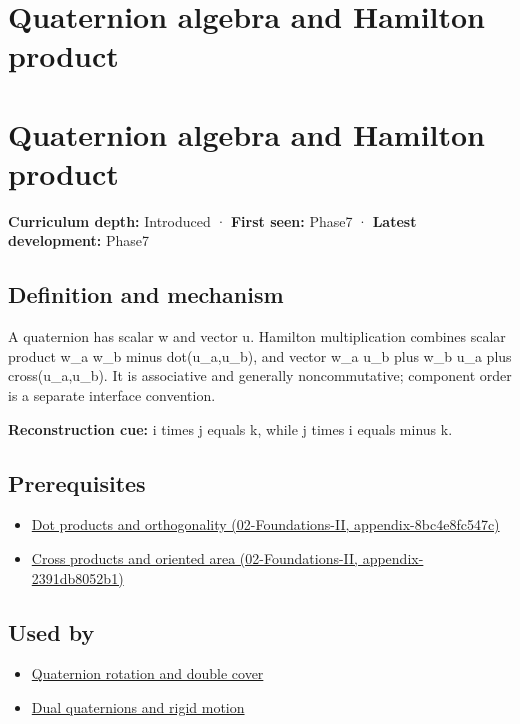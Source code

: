 \hypertarget{appendix-965d9260eeab}{}
\section*{Quaternion algebra and Hamilton product}
\section{Quaternion algebra and Hamilton product}\label{appendix-965d9260eeab-quaternion-algebra-and-hamilton-product}

\textbf{Curriculum depth:} Introduced · \textbf{First seen:} Phase7 · \textbf{Latest development:} Phase7

\subsection{Definition and mechanism}\label{appendix-965d9260eeab-definition-and-mechanism}

A quaternion has scalar w and vector u. Hamilton multiplication combines scalar product w\_a w\_b minus dot(u\_a,u\_b), and vector w\_a u\_b plus w\_b u\_a plus cross(u\_a,u\_b). It is associative and generally noncommutative; component order is a separate interface convention.

\textbf{Reconstruction cue:} i times j equals k, while j times i equals minus k.

\subsection{Prerequisites}\label{appendix-965d9260eeab-prerequisites}

\begin{itemize}
\tightlist
\item
  \href{../02-Foundations-II/main.pdf\#nameddest=appendix-8bc4e8fc547c}{Dot products and orthogonality (02-Foundations-II, appendix-8bc4e8fc547c)}
\item
  \href{../02-Foundations-II/main.pdf\#nameddest=appendix-2391db8052b1}{Cross products and oriented area (02-Foundations-II, appendix-2391db8052b1)}
\end{itemize}

\subsection{Used by}\label{appendix-965d9260eeab-used-by}

\begin{itemize}
\tightlist
\item
  \hyperref[appendix-8e61ab68f6b2]{Quaternion rotation and double cover}
\item
  \hyperref[appendix-d1ea57347893]{Dual quaternions and rigid motion}
\end{itemize}

